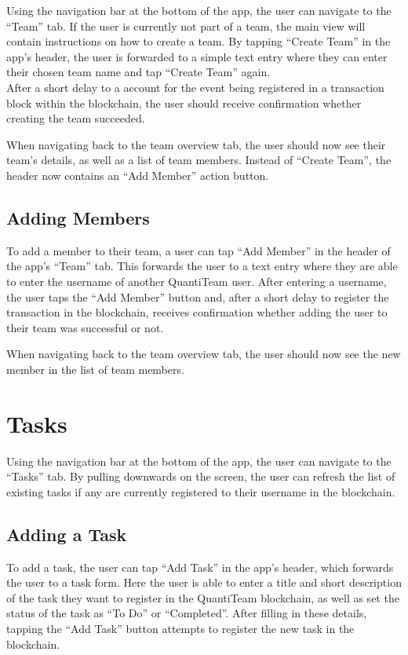 Using the navigation bar at the bottom of the app, the user can navigate
to the ``Team'' tab. If the user is currently not part of a team, the
main view will contain instructions on how to create a team. By tapping
``Create Team'' in the app's header, the user is forwarded to a simple
text entry where they can enter their chosen team name and tap ``Create
Team'' again.\\
After a short delay to a account for the event being registered in a
transaction block within the blockchain, the user should receive
confirmation whether creating the team succeeded.

When navigating back to the team overview tab, the user should now see
their team's details, as well as a list of team members. Instead of
``Create Team'', the header now contains an ``Add Member'' action
button.

\subsection{Adding Members}\label{adding-members}

To add a member to their team, a user can tap ``Add Member'' in the
header of the app's ``Team'' tab. This forwards the user to a text entry
where they are able to enter the username of another QuantiTeam user.
After entering a username, the user taps the ``Add Member'' button and,
after a short delay to register the transaction in the blockchain,
receives confirmation whether adding the user to their team was
successful or not.

When navigating back to the team overview tab, the user should now see
the new member in the list of team members.

\section{Tasks}\label{tasks}

Using the navigation bar at the bottom of the app, the user can navigate
to the ``Tasks'' tab. By pulling downwards on the screen, the user can
refresh the list of existing tasks if any are currently registered to
their username in the blockchain.

\subsection{Adding a Task}\label{adding-a-task}

To add a task, the user can tap ``Add Task'' in the app's header, which
forwards the user to a task form. Here the user is able to enter a title
and short description of the task they want to register in the
QuantiTeam blockchain, as well as set the status of the task as ``To
Do'' or ``Completed''. After filling in these details, tapping the ``Add
Task'' button attempts to register the new task in the blockchain.


